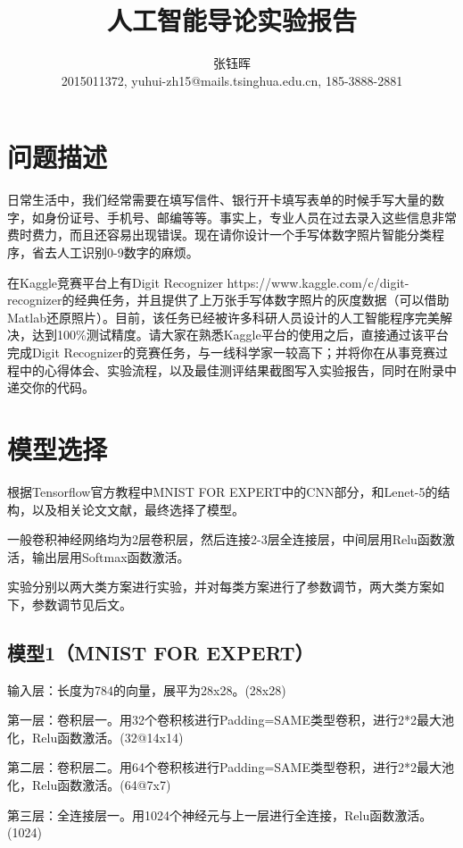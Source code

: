 \documentclass{article}
\title{\Huge{人工智能导论实验报告}}
\date{}
\begin{document}
\author{张钰晖\\2015011372, yuhui-zh15@mails.tsinghua.edu.cn, 185-3888-2881}
\maketitle
\tableofcontents

\newpage
\section{问题描述}

日常生活中，我们经常需要在填写信件、银行开卡填写表单的时候手写大量的数字，如身份证号、手机号、邮编等等。事实上，专业人员在过去录入这些信息非常费时费力，而且还容易出现错误。现在请你设计一个手写体数字照片智能分类程序，省去人工识别0-9数字的麻烦。

在Kaggle竞赛平台上有Digit Recognizer https://www.kaggle.com/c/digit-recognizer的经典任务，并且提供了上万张手写体数字照片的灰度数据（可以借助Matlab还原照片）。目前，该任务已经被许多科研人员设计的人工智能程序完美解决，达到100\%测试精度。请大家在熟悉Kaggle平台的使用之后，直接通过该平台完成Digit Recognizer的竞赛任务，与一线科学家一较高下；并将你在从事竞赛过程中的心得体会、实验流程，以及最佳测评结果截图写入实验报告，同时在附录中递交你的代码。

\section{模型选择}
  根据Tensorflow官方教程中MNIST FOR EXPERT中的CNN部分，和Lenet-5的结构，以及相关论文文献，最终选择了模型。

  一般卷积神经网络均为2层卷积层，然后连接2-3层全连接层，中间层用Relu函数激活，输出层用Softmax函数激活。

  实验分别以两大类方案进行实验，并对每类方案进行了参数调节，两大类方案如下，参数调节见后文。


  \subsection{模型1（MNIST FOR EXPERT）}

  输入层：长度为784的向量，展平为28x28。(28x28)
  
  第一层：卷积层一。用32个卷积核进行Padding=SAME类型卷积，进行2*2最大池化，Relu函数激活。(32@14x14)
  
  第二层：卷积层二。用64个卷积核进行Padding=SAME类型卷积，进行2*2最大池化，Relu函数激活。(64@7x7)
  
  第三层：全连接层一。用1024个神经元与上一层进行全连接，Relu函数激活。(1024)
  
\end{document}
